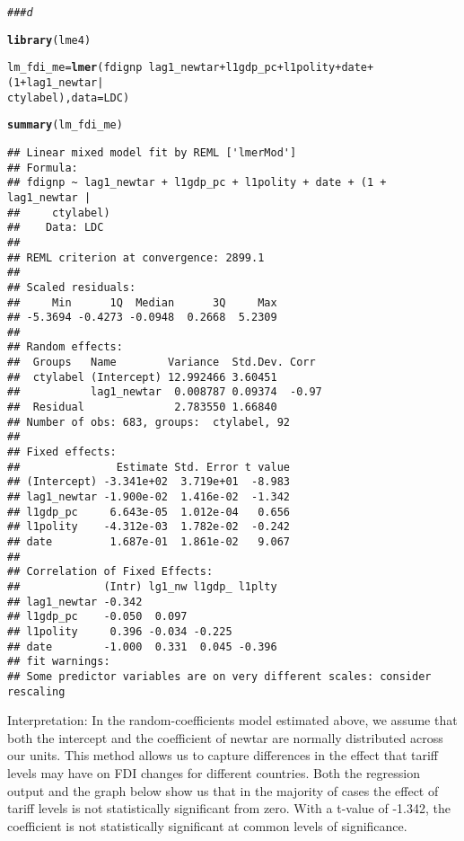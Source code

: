 \documentclass[12pt]{article}\usepackage[]{graphicx}\usepackage[]{color}
\makeatletter
\newcommand{\hlnum}[1]{\textcolor[rgb]{0.686,0.059,0.569}{#1}}%
\newcommand{\hlcom}[1]{\textcolor[rgb]{0.678,0.584,0.686}{\textit{#1}}}%
\newcommand{\hlopt}[1]{\textcolor[rgb]{0,0,0}{#1}}%
\newcommand{\hlstd}[1]{\textcolor[rgb]{0.345,0.345,0.345}{#1}}%
\newcommand{\hlkwb}[1]{\textcolor[rgb]{0.69,0.353,0.396}{#1}}%
\newcommand{\hlkwc}[1]{\textcolor[rgb]{0.333,0.667,0.333}{#1}}%
\newcommand{\hlkwd}[1]{\textcolor[rgb]{0.737,0.353,0.396}{\textbf{#1}}}%
\newenvironment{kframe}{%
 \def\at@end@of@kframe{}%
 \ifinner\ifhmode%
  \def\at@end@of@kframe{\end{minipage}}%
  \begin{minipage}{\columnwidth}%
 \fi\fi%
 \def\FrameCommand##1{\hskip\@totalleftmargin \hskip-\fboxsep
 \colorbox{shadecolor}{##1}\hskip-\fboxsep
     \hskip-\linewidth \hskip-\@totalleftmargin \hskip\columnwidth}%
 \MakeFramed {\advance\hsize-\width
   \@totalleftmargin\z@ \linewidth\hsize
   \@setminipage}}%
 {\par\unskip\endMakeFramed%
 \at@end@of@kframe}
\newenvironment{knitrout}{}{} %
\makeatother
\begin{document}
\begin{knitrout}
\color{fgcolor}\begin{kframe}
\begin{alltt}
\hlcom{### d}

\hlkwd{library}\hlstd{(lme4)}

\hlstd{lm_fdi_me} \hlkwb{=} \hlkwd{lmer}\hlstd{(fdignp} \hlopt{~} \hlstd{lag1_newtar} \hlopt{+} \hlstd{l1gdp_pc} \hlopt{+} \hlstd{l1polity} \hlopt{+} \hlstd{date} \hlopt{+} \hlstd{(}\hlnum{1} \hlopt{+} \hlstd{lag1_newtar} \hlopt{|}
    \hlstd{ctylabel),} \hlkwc{data} \hlstd{= LDC)}
\end{alltt}


{\ttfamily\noindent\color{warningcolor}{\#\# Warning: Some predictor variables are on very different scales: consider rescaling}}\begin{alltt}
\hlkwd{summary}\hlstd{(lm_fdi_me)}
\end{alltt}
\begin{verbatim}
## Linear mixed model fit by REML ['lmerMod']
## Formula: 
## fdignp ~ lag1_newtar + l1gdp_pc + l1polity + date + (1 + lag1_newtar |  
##     ctylabel)
##    Data: LDC
## 
## REML criterion at convergence: 2899.1
## 
## Scaled residuals: 
##     Min      1Q  Median      3Q     Max 
## -5.3694 -0.4273 -0.0948  0.2668  5.2309 
## 
## Random effects:
##  Groups   Name        Variance  Std.Dev. Corr 
##  ctylabel (Intercept) 12.992466 3.60451       
##           lag1_newtar  0.008787 0.09374  -0.97
##  Residual              2.783550 1.66840       
## Number of obs: 683, groups:  ctylabel, 92
## 
## Fixed effects:
##               Estimate Std. Error t value
## (Intercept) -3.341e+02  3.719e+01  -8.983
## lag1_newtar -1.900e-02  1.416e-02  -1.342
## l1gdp_pc     6.643e-05  1.012e-04   0.656
## l1polity    -4.312e-03  1.782e-02  -0.242
## date         1.687e-01  1.861e-02   9.067
## 
## Correlation of Fixed Effects:
##             (Intr) lg1_nw l1gdp_ l1plty
## lag1_newtar -0.342                     
## l1gdp_pc    -0.050  0.097              
## l1polity     0.396 -0.034 -0.225       
## date        -1.000  0.331  0.045 -0.396
## fit warnings:
## Some predictor variables are on very different scales: consider rescaling
\end{verbatim}
\end{kframe}
\end{knitrout}

Interpretation: In the random-coefficients model estimated above, we assume that both the intercept and the coefficient of newtar are normally distributed across our units. This method allows us to capture differences in the effect that tariff levels may have on FDI changes for different countries. Both the regression output and the graph below show us that in the majority of cases the effect of tariff levels is not statistically significant from zero. With a t-value of -1.342, the coefficient is not statistically significant at common levels of significance.
\end{document}
